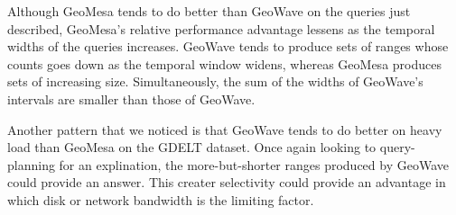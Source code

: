 Although GeoMesa tends to do better than GeoWave on the queries just described, GeoMesa's relative performance advantage lessens as the temporal widths of the queries increases.
GeoWave tends to produce sets of ranges whose counts goes down as the temporal window widens, whereas GeoMesa produces sets of increasing size.
Simultaneously, the sum of the widths of GeoWave's intervals are smaller than those of GeoWave.

Another pattern that we noticed is that GeoWave tends to do better on heavy load than GeoMesa on the GDELT dataset.
Once again looking to query-planning for an explination, the more-but-shorter ranges produced by GeoWave could provide an answer.
This creater selectivity could provide an advantage in which disk or network bandwidth is the limiting factor.
